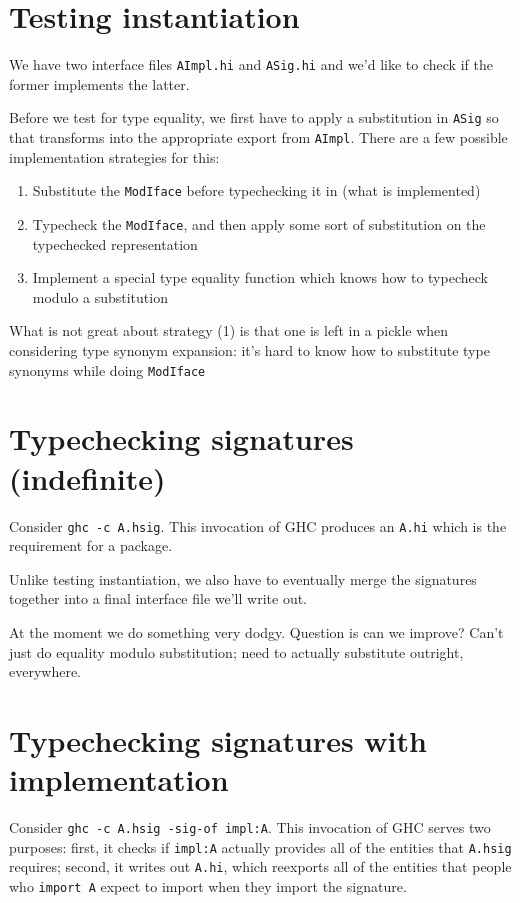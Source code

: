 \section{Testing instantiation}

We have two interface files \verb|AImpl.hi| and \verb|ASig.hi| and
we'd like to check if the former implements the latter.

Before we test for type equality, we first have to apply a substitution
in \verb|ASig| so that  transforms into the appropriate export
from \verb|AImpl|.  There are a few possible implementation strategies
for this:

\begin{enumerate}
    \item Substitute the \verb|ModIface| before typechecking it in
        (what is implemented)
    \item Typecheck the \verb|ModIface|, and then apply some sort of
        substitution on the typechecked representation
    \item Implement a special type equality function which knows
        how to typecheck modulo a substitution
\end{enumerate}

What is not great about strategy (1) is that one is left in a pickle
when considering type synonym expansion: it's hard to know how to
substitute type synonyms while doing \verb|ModIface|

\section{Typechecking signatures (indefinite)}

Consider \verb|ghc -c A.hsig|.  This invocation of GHC produces an
\verb|A.hi| which is the requirement for a package.

Unlike testing instantiation, we also have to eventually merge
the signatures together into a final interface file we'll write out.

At the moment we do something very dodgy.  Question is can
we improve?  Can't just do equality modulo substitution; need
to actually substitute outright, everywhere.

\section{Typechecking signatures with implementation}

Consider \verb|ghc -c A.hsig -sig-of impl:A|.  This invocation of
GHC serves two purposes: first, it checks if \verb|impl:A| actually
provides all of the entities that \verb|A.hsig| requires; second,
it writes out \verb|A.hi|, which reexports all of the entities
that people who \verb|import A| expect to import when they
import the signature.

\fi
